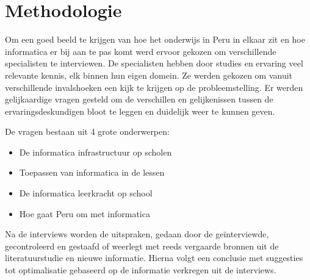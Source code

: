 
\chapter{Methodologie}
\label{ch:methodologie}


Om een goed beeld te krijgen van hoe het onderwijs in Peru in elkaar zit en hoe informatica er bij aan te pas komt werd ervoor gekozen om verschillende specialisten te interviewen.  De specialisten hebben door studies en ervaring veel relevante kennis, elk binnen hun eigen domein. Ze werden gekozen om vanuit verschillende invalshoeken een kijk te krijgen op de probleemstelling. Er werden gelijkaardige vragen gesteld om de verschillen en gelijkenissen tussen de ervaringsdeskundigen bloot te leggen en duidelijk weer te kunnen geven.

De vragen bestaan uit 4 grote onderwerpen: 

\begin{itemize}
	\item De informatica infrastructuur op scholen
	\item Toepassen van informatica in de lessen
	\item De informatica leerkracht op school
	\item Hoe gaat Peru om met informatica
\end{itemize}

Na de interviews worden de uitspraken, gedaan door de geïnterviewde, gecontroleerd en gestaafd of weerlegt met reeds vergaarde bronnen uit de literatuurstudie en nieuwe informatie. Hierna volgt een conclusie met suggesties tot optimalisatie gebaseerd op de informatie verkregen uit de interviews.


